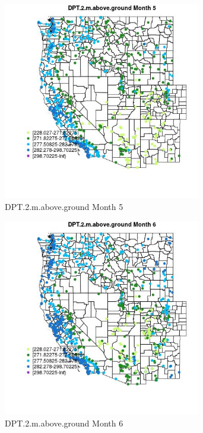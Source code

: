 \begin{figure} 
\centering  
\includegraphics[width=0.77\textwidth]{Code_Outputs/Report_ML_input_PM25_Step4_part_f_de_duplicated_aves_prioritize_24hr_obswNAs_MapObsMo5DPT2maboveground.jpg} 
\caption{\label{fig:Report_ML_input_PM25_Step4_part_f_de_duplicated_aves_prioritize_24hr_obswNAsMapObsMo5DPT2maboveground}DPT.2.m.above.ground Month 5} 
\end{figure} 
 

\begin{figure} 
\centering  
\includegraphics[width=0.77\textwidth]{Code_Outputs/Report_ML_input_PM25_Step4_part_f_de_duplicated_aves_prioritize_24hr_obswNAs_MapObsMo6DPT2maboveground.jpg} 
\caption{\label{fig:Report_ML_input_PM25_Step4_part_f_de_duplicated_aves_prioritize_24hr_obswNAsMapObsMo6DPT2maboveground}DPT.2.m.above.ground Month 6} 
\end{figure} 
 

